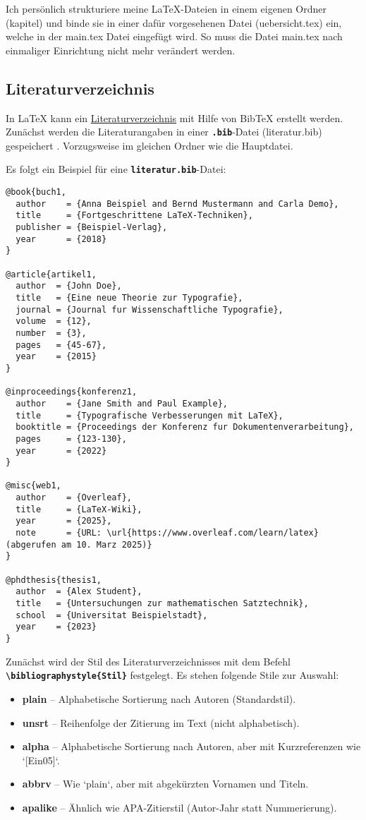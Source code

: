 Ich persönlich strukturiere meine \LaTeX{}-Dateien in einem eigenen Ordner (kapitel) und binde sie in einer dafür vorgesehenen Datei (uebersicht.tex) ein, welche in der main.tex Datei eingefügt wird. So muss die Datei main.tex nach einmaliger Einrichtung nicht mehr verändert werden.


\subsection{Literaturverzeichnis}
\label{sec:literaturverzeichnis_erklärung}
In \LaTeX{} kann ein \hyperref[sec:literaturverzeichnis]{Literaturverzeichnis} mit Hilfe von BibTeX erstellt werden.
Zunächst werden die Literaturangaben in einer \textbf{\texttt{.bib}}-Datei (literatur.bib) gespeichert . Vorzugsweise im gleichen Ordner wie die Hauptdatei.

Es folgt ein Beispiel für eine \textbf{\texttt{literatur.bib}}-Datei:

\begin{lstlisting}[language={[LaTeX]TeX}]
@book{buch1,
  author    = {Anna Beispiel and Bernd Mustermann and Carla Demo},
  title     = {Fortgeschrittene LaTeX-Techniken},
  publisher = {Beispiel-Verlag},
  year      = {2018}
}

@article{artikel1,
  author  = {John Doe},
  title   = {Eine neue Theorie zur Typografie},
  journal = {Journal fur Wissenschaftliche Typografie},
  volume  = {12},
  number  = {3},
  pages   = {45-67},
  year    = {2015}
}

@inproceedings{konferenz1,
  author    = {Jane Smith and Paul Example},
  title     = {Typografische Verbesserungen mit LaTeX},
  booktitle = {Proceedings der Konferenz fur Dokumentenverarbeitung},
  pages     = {123-130},
  year      = {2022}
}

@misc{web1,
  author    = {Overleaf},
  title     = {LaTeX-Wiki},
  year      = {2025},
  note      = {URL: \url{https://www.overleaf.com/learn/latex} (abgerufen am 10. Marz 2025)}
}

@phdthesis{thesis1,
  author  = {Alex Student},
  title   = {Untersuchungen zur mathematischen Satztechnik},
  school  = {Universitat Beispielstadt},
  year    = {2023}
}
\end{lstlisting}

Zunächst wird der Stil des Literaturverzeichnisses mit dem Befehl \textbf{\texttt{\textbackslash bibliographystyle\{Stil\}}} festgelegt.
Es stehen folgende Stile zur Auswahl:
\begin{itemize}
  \item \textbf{plain} – Alphabetische Sortierung nach Autoren (Standardstil).
  \item \textbf{unsrt} – Reihenfolge der Zitierung im Text (nicht alphabetisch).
  \item \textbf{alpha} – Alphabetische Sortierung nach Autoren, aber mit Kurzreferenzen wie `[Ein05]`.
  \item \textbf{abbrv} – Wie `plain`, aber mit abgekürzten Vornamen und Titeln.
  \item \textbf{apalike} – Ähnlich wie APA-Zitierstil (Autor-Jahr statt Nummerierung).
\end{itemize}

